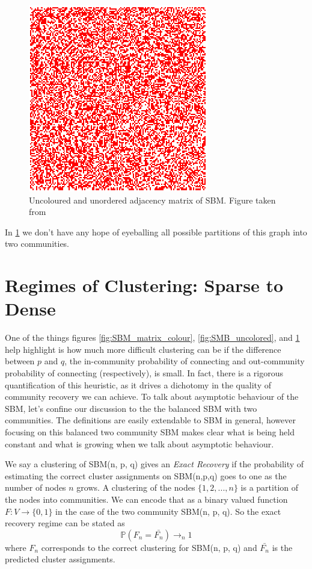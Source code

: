 \begin{figure}[h]
\begin{center}
  \includegraphics[scale=0.5]{SBM_unordered}
  \caption{Uncoloured and unordered adjacency matrix of SBM.  Figure taken from \cite{SBM_adjacency_talk}}
  \label{fig:SMB_unordered}
 \end{center}
\end{figure}

In \ref{fig:SMB_unordered} we don't have any hope of eyeballing all possible partitions of this graph into two communities.  

\section{Regimes of Clustering: Sparse to Dense}

One of the things figures \ref{fig:SBM_matrix_colour}, \ref{fig:SMB_uncolored}, and \ref{fig:SMB_unordered} help highlight is how much more difficult clustering can be if the difference between $p$ and $q$, the in-community probability of connecting and out-community probability of connecting (respectively), is small.  In fact, there is a rigorous quantification of this heuristic, as it drives a dichotomy in the quality of community recovery we can achieve. 
To talk about asymptotic behaviour of the SBM, let's confine our discussion to the the balanced SBM with two communities.  The definitions are easily extendable to SBM in general, however focusing on this balanced two community SBM makes clear what is being held constant and what is growing when we talk about asymptotic behaviour. 


\begin{definition}
We say a clustering of SBM(n, p, q) gives an \textit{Exact Recovery} if the probability of estimating the correct cluster assignments on SBM(n,p,q) goes to one as the number of nodes $n$ grows.  A clustering of the nodes $\{1, 2, ..., n\}$ is a partition of the nodes into communities.  We can encode that as a binary valued function $F : V \rightarrow \{0,1\}$ in the case of the two community SBM(n, p, q). So the exact recovery regime can be stated as $$\mathbb{P}( F_n = \bar{F_n}) \rightarrow_n 1$$  where $F_n$ corresponds to the correct clustering for SBM(n, p, q) and $\bar{F_n}$ is the predicted cluster assignments.   
\end{definition}

